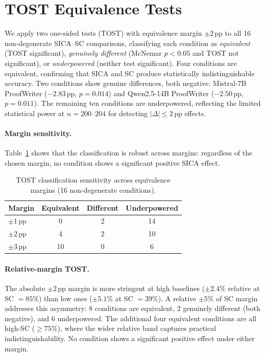 \section{TOST Equivalence Tests}
\label{app:tost}

We apply two one-sided tests (TOST) \citep{lakens2017equivalence} with equivalence margin $\pm 2$\,pp to all 16 non-degenerate SICA--SC comparisons, classifying each condition as \emph{equivalent} (TOST significant), \emph{genuinely different} (McNemar $p < 0.05$ and TOST not significant), or \emph{underpowered} (neither test significant). Four conditions are equivalent, confirming that SICA and SC produce statistically indistinguishable accuracy. Two conditions show genuine differences, both negative: Mistral-7B ProofWriter ($-2.83$\,pp, $p = 0.014$) and Qwen2.5-14B ProofWriter ($-2.50$\,pp, $p = 0.011$). The remaining ten conditions are underpowered, reflecting the limited statistical power at $n{=}200$--$204$ for detecting $|\Delta| \leq 2$\,pp effects.

\paragraph{Margin sensitivity.} Table~\ref{tab:tost-sensitivity} shows that the classification is robust across margins: regardless of the chosen margin, no condition shows a significant positive SICA effect.

\begin{table}[h]
\centering
\small
\caption{TOST classification sensitivity across equivalence margins (16 non-degenerate conditions).}
\label{tab:tost-sensitivity}
\begin{tabular}{@{}lccc@{}}
\toprule
Margin & Equivalent & Different & Underpowered \\
\midrule
$\pm 1$\,pp & 0 & 2 & 14 \\
$\pm 2$\,pp & 4 & 2 & 10 \\
$\pm 3$\,pp & 10 & 0 & 6 \\
\bottomrule
\end{tabular}
\end{table}

\paragraph{Relative-margin TOST.}
\label{app:relative_tost}
The absolute $\pm 2$\,pp margin is more stringent at high baselines ($\pm 2.4\%$ relative at SC $= 85\%$) than low ones ($\pm 5.1\%$ at SC $= 39\%$). A relative $\pm 5\%$ of SC margin addresses this asymmetry: 8 conditions are equivalent, 2 genuinely different (both negative), and 6 underpowered. The additional four equivalent conditions are all high-SC ($\geq 75\%$), where the wider relative band captures practical indistinguishability. No condition shows a significant positive effect under either margin.

